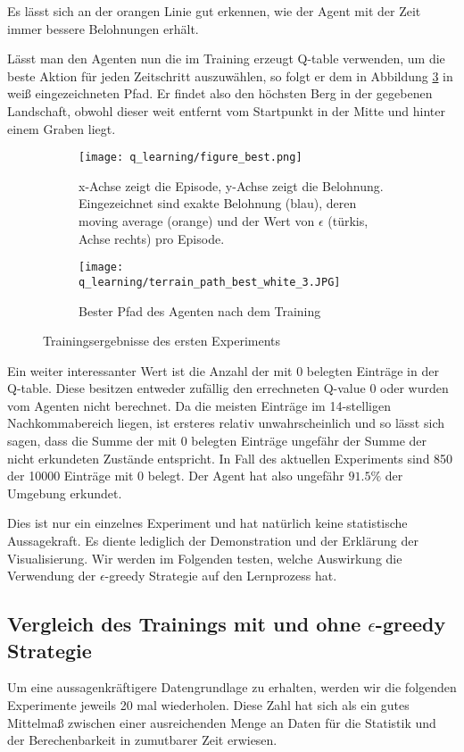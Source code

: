 Es lässt sich an der orangen Linie gut erkennen, wie der Agent mit der Zeit immer bessere Belohnungen erhält.

Lässt man den Agenten nun die im Training erzeugt Q-table verwenden, um die beste Aktion für jeden Zeitschritt auszuwählen, so folgt er dem in Abbildung \ref{img:pathQBest} in weiß eingezeichneten Pfad. Er findet also den höchsten Berg in der gegebenen Landschaft, obwohl dieser weit entfernt vom Startpunkt in der Mitte und hinter einem Graben liegt.

\begin{figure}[h!]
    \centering
    \begin{subfigure}[b]{0.49\textwidth}
        \texttt{[image: q\_learning/figure\_best.png]}
        \caption{x-Achse zeigt die Episode, y-Achse zeigt die Belohnung. Eingezeichnet sind exakte Belohnung (blau), deren moving average (orange) und der Wert von $ \epsilon $ (türkis, Achse rechts) pro Episode.}
        \label{img:graphQBest}
    \end{subfigure}
    \begin{subfigure}[b]{0.49\textwidth}
        \texttt{[image: q\_learning/terrain\_path\_best\_white\_3.JPG]}
        \caption{Bester Pfad des Agenten nach dem Training}
        \label{img:pathQBest}
    \end{subfigure}
    \caption{Trainingsergebnisse des ersten Experiments}
\end{figure}

Ein weiter interessanter Wert ist die Anzahl der mit 0 belegten Einträge in der Q-table. Diese besitzen entweder zufällig den errechneten Q-value 0 oder wurden vom Agenten nicht berechnet. Da die meisten Einträge im 14-stelligen Nachkommabereich liegen, ist ersteres relativ unwahrscheinlich und so lässt sich sagen, dass die Summe der mit 0 belegten Einträge ungefähr der Summe der nicht erkundeten Zustände entspricht. In Fall des aktuellen Experiments sind 850 der 10000 Einträge mit 0 belegt. Der Agent hat also ungefähr $ 91.5\% $ der Umgebung erkundet.

Dies ist nur ein einzelnes Experiment und hat natürlich keine statistische Aussagekraft. Es diente lediglich der Demonstration und der Erklärung der Visualisierung. Wir werden im Folgenden testen, welche Auswirkung die Verwendung der $ \epsilon $-greedy Strategie auf den Lernprozess hat.

\subsection{Vergleich des Trainings mit und ohne $ \epsilon $-greedy Strategie}
Um eine aussagenkräftigere Datengrundlage zu erhalten, werden wir die folgenden Experimente jeweils 20 mal wiederholen. Diese Zahl hat sich als ein gutes Mittelmaß zwischen einer ausreichenden Menge an Daten für die Statistik und der Berechenbarkeit in zumutbarer Zeit erwiesen.

